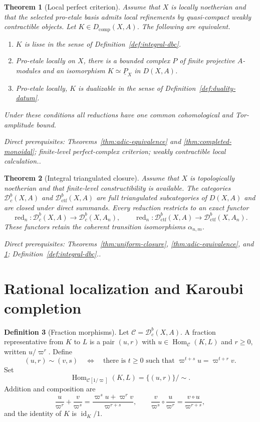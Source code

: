 \documentclass[10pt]{article}
\newtheorem{theorem}{Theorem}[section]
\theoremstyle{definition}
\newtheorem{definition}[theorem]{Definition}
\newcommand{\Dbc}{\mathcal D^b_c}
\newcommand{\Dctf}{\mathcal D^b_{\mathrm{ctf}}}
\newcommand{\Hom}{\operatorname{Hom}}
\newcommand{\depends}[1]{\par\smallskip\noindent\textit{Direct prerequisites:} #1.}
\begin{document}
\begin{theorem}[Local perfect criterion]\label{thm:local-perfect}
Assume that $X$ is locally noetherian and that the selected pro-etale basis
admits local refinements by quasi-compact weakly contractible objects.  Let
$K\in D_{\mathrm{comp}}(X,A)$.  The following are equivalent.
\begin{enumerate}
\item $K$ is lisse in the sense of Definition~\ref{def:integral-dbc}.
\item Pro-etale locally on $X$, there is a bounded complex $P$ of finite
projective $A$-modules and an isomorphism
$K\simeq\underline P_X$ in $D(X,A)$.
\item Pro-etale locally, $K$ is dualizable in the sense of
Definition~\ref{def:duality-datum}.
\end{enumerate}
Under these conditions all reductions have one common cohomological and
Tor-amplitude bound.
\depends{Theorems~\ref{thm:adic-equivalence} and
\ref{thm:completed-monoidal}; finite-level perfect-complex criterion;
weakly contractible local calculation.}
\end{theorem}

\begin{theorem}[Integral triangulated closure]\label{thm:integral-closure}
Assume that $X$ is topologically noetherian and that finite-level
constructibility is available.  The categories $\Dbc(X,A)$ and
$\Dctf(X,A)$ are full triangulated subcategories of $D(X,A)$ and are closed
under direct summands.  Every reduction restricts to an exact functor
\[
 \operatorname{red}_n:\Dbc(X,A)\longrightarrow\Dbc(X,A_n),
\qquad
 \operatorname{red}_n:\Dctf(X,A)\longrightarrow\Dctf(X,A_n).
\]
These functors retain the coherent transition isomorphisms
$\alpha_{n,m}$.
\depends{Theorems~\ref{thm:uniform-closure},
\ref{thm:adic-equivalence}, and \ref{thm:local-perfect};
Definition~\ref{def:integral-dbc}.}
\end{theorem}

\section{Rational localization and Karoubi completion}

\begin{definition}[Fraction morphisms]\label{def:fraction-category}
Let $\mathcal C=\Dbc(X,A)$.  A fraction representative from $K$ to $L$ is
a pair $(u,r)$ with $u\in\Hom_{\mathcal C}(K,L)$ and $r\geq0$, written
$u/\varpi^r$.  Define
\[
 (u,r)\sim(v,s)
 \quad\Longleftrightarrow\quad
 \text{there is $t\geq0$ such that }
 \varpi^{t+s}u=\varpi^{t+r}v.
\]
Set
\[
 \Hom_{\mathcal C[1/\varpi]}(K,L)
 =\{(u,r)\}/\!\sim.
\]
Addition and composition are
\[
 \frac{u}{\varpi^r}+\frac{v}{\varpi^s}
   =\frac{\varpi^su+\varpi^rv}{\varpi^{r+s}},
 \qquad
 \frac{v}{\varpi^s}\circ\frac{u}{\varpi^r}
   =\frac{v\circ u}{\varpi^{r+s}},
\]
and the identity of $K$ is $\operatorname{id}_K/1$.
\end{definition}
\end{document}
